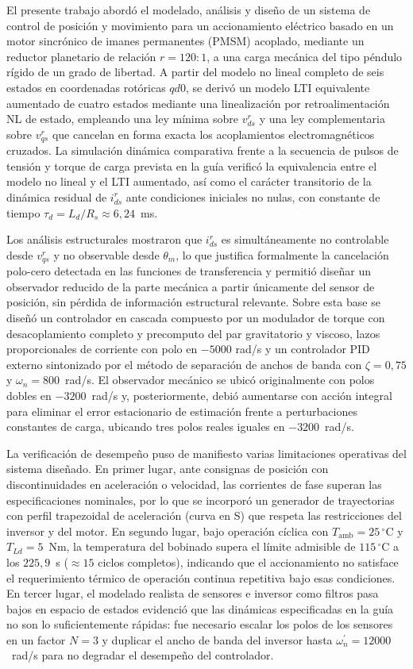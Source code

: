\documentclass[12pt, a4paper,journal, onecolumn, compsoc]{IEEEtran}
\begin{document}
El presente trabajo abordó el modelado, análisis y diseño de un sistema de control de posición y movimiento para un accionamiento eléctrico basado en un motor sincrónico de imanes permanentes (PMSM) acoplado, mediante un reductor planetario de relación $r=120{:}1$, a una carga mecánica del tipo péndulo rígido de un grado de libertad. A partir del modelo no lineal completo de seis estados en coordenadas rotóricas $qd0$, se derivó un modelo LTI equivalente aumentado de cuatro estados mediante una linealización por retroalimentación NL de estado, empleando una ley mínima sobre $v_{ds}^{r}$ y una ley complementaria sobre $v_{qs}^{r}$ que cancelan en forma exacta los acoplamientos electromagnéticos cruzados. La simulación dinámica comparativa frente a la secuencia de pulsos de tensión y torque de carga prevista en la guía verificó la equivalencia entre el modelo no lineal y el LTI aumentado, así como el carácter transitorio de la dinámica residual de $i_{ds}^{r}$ ante condiciones iniciales no nulas, con constante de tiempo $\tau_d = L_d/R_s \approx 6{,}24$~ms.

Los análisis estructurales mostraron que $i_{ds}^{r}$ es simultáneamente no controlable desde $v_{qs}^{r}$ y no observable desde $\theta_m$, lo que justifica formalmente la cancelación polo-cero detectada en las funciones de transferencia y permitió diseñar un observador reducido de la parte mecánica a partir únicamente del sensor de posición, sin pérdida de información estructural relevante. Sobre esta base se diseñó un controlador en cascada compuesto por un modulador de torque con desacoplamiento completo y precomputo del par gravitatorio y viscoso, lazos proporcionales de corriente con polo en $-5000$ rad/s y un controlador PID externo sintonizado por el método de separación de anchos de banda con $\zeta = 0{,}75$ y $\omega_n = 800$~rad/s. El observador mecánico se ubicó originalmente con polos dobles en $-3200$~rad/s y, posteriormente, debió aumentarse con acción integral para eliminar el error estacionario de estimación frente a perturbaciones constantes de carga, ubicando tres polos reales iguales en $-3200$~rad/s.

La verificación de desempeño puso de manifiesto varias limitaciones operativas del sistema diseñado. En primer lugar, ante consignas de posición con discontinuidades en aceleración o velocidad, las corrientes de fase superan las especificaciones nominales, por lo que se incorporó un generador de trayectorias con perfil trapezoidal de aceleración (curva en S) que respeta las restricciones del inversor y del motor. En segundo lugar, bajo operación cíclica con $T_{\mathrm{amb}}=25\,^\circ$C y $T_{Ld}=5$~Nm, la temperatura del bobinado supera el límite admisible de $115\,^\circ$C a los $225{,}9$~s ($\approx 15$ ciclos completos), indicando que el accionamiento no satisface el requerimiento térmico de operación continua repetitiva bajo esas condiciones. En tercer lugar, el modelado realista de sensores e inversor como filtros pasa bajos en espacio de estados evidenció que las dinámicas especificadas en la guía no son lo suficientemente rápidas: fue necesario escalar los polos de los sensores en un factor $N=3$ y duplicar el ancho de banda del inversor hasta $\omega_n^{\prime}=12000$~rad/s para no degradar el desempeño del controlador.
\end{document}
